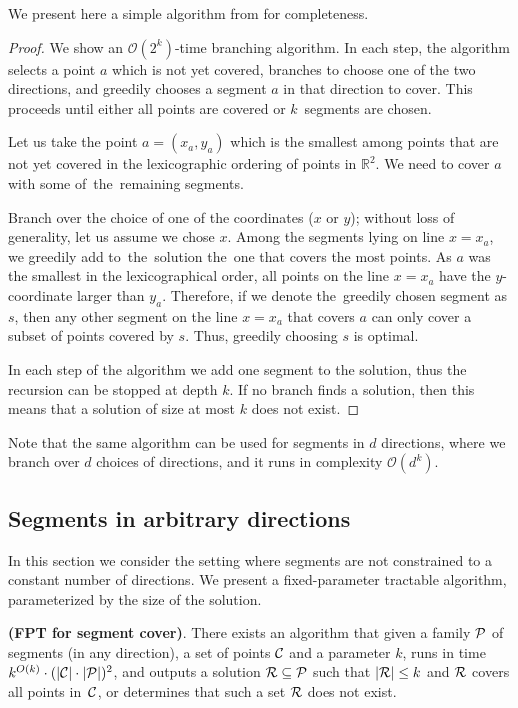 We present here a simple algorithm from \cite{platypus_book} for completeness.

\begin{proof}
We show an $\mathcal{O}(2^k)$-time branching algorithm.
In each step, the algorithm selects a point $a$ which is not yet covered,
branches to choose one of the two directions, and greedily chooses
a segment $a$ in that direction to cover.
This proceeds until either all points are covered or $k$~segments are chosen.

Let us take
the point $a=(x_a,y_a)$ which is the smallest 
among points that are not yet covered
in the lexicographic ordering
of points in $\mathbb{R}^2$.
We need to cover $a$ with some of~the~remaining segments.

Branch over the choice of one of the coordinates ($x$ or $y$);
without loss of generality, let us assume we chose $x$.
Among the segments lying on line $x = x_a$,
we greedily add to~the~solution the~one that covers the most points.
As $a$ was the smallest in the lexicographical order,
all points on the line $x = x_a$ have the $y$-coordinate larger than $y_a$.
Therefore, if we denote the~greedily chosen segment as $s$,
then any other segment on the line $x = x_a$ that covers $a$ can only
cover a subset of points covered by $s$.
Thus, greedily choosing $s$ is optimal.

In each step of the algorithm we add one segment to the solution,
thus the recursion can be stopped at depth $k$.
If no branch finds a solution, then this means
that a solution of size at most $k$ does not exist.
\end{proof}

Note that the same algorithm can be used for segments in $d$ directions,
where we branch over $d$ choices of directions, and it runs in complexity $\mathcal{O}(d^k)$.

\subsection{Segments in arbitrary directions}
\label{segments_in_arbitrary_direction}
In this section we consider the setting where segments are not constrained
to a constant number of directions. 
We present a fixed-parameter tractable algorithm,
parameterized by the size of the solution.

\begin{tw}{
	\label{segment_cover_fpt}
	\textbf{(FPT for segment cover)}.
	There exists an algorithm that given a family $\mathcal{P}$ of
	segments (in any direction),
	a set of points $\mathcal{C}$
	and a parameter $k$,
	runs in time $k^{O(k)} \cdot (|\mathcal{C}|\cdot|\mathcal{P}|)^2$,
	and outputs a solution $\mathcal{R} \subseteq \mathcal{P}$
	such that $|\mathcal{R}| \le k$ and $\mathcal{R}$ covers all points in~$\mathcal{C}$,
	or determines that such a set $\mathcal{R}$ does not exist.
}\end{tw}

